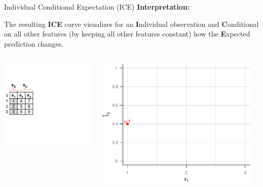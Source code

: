 \documentclass[11pt,compress,t,notes=noshow, xcolor=table]{beamer}
\begin{document}
\begin{vbframe}{Individual Conditional Expectation (ICE)}
\textbf{Interpretation:}

The resulting \textbf{ICE} curve visualizes for an \textbf{I}ndividual observation and \textbf{C}onditional on all other features (by keeping all other features constant) how the \textbf{E}xpected prediction changes.

\framebreak




\begin{columns}[T]
\begin{column}{0.45\textwidth}
\includegraphics[page=6, trim=0cm 0.35cm 0.85cm 0.35cm, width=\textwidth]{figure_man/ice_plot_demo}
\end{column}
\begin{column}{0.55\textwidth}
\includegraphics[page=4, width=0.95\textwidth]{figure_man/ICE}
\end{column}
\end{columns}
\vspace*{\topsep}


\end{vbframe}
\end{document}
